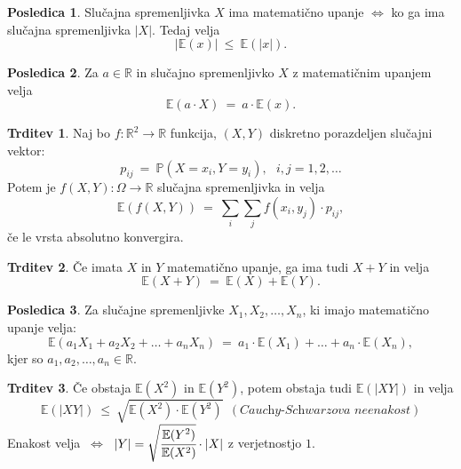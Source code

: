 \documentclass[11pt]{article}
\theoremstyle{definition}
\theoremstyle{definition}
\newtheorem{trditev}{Trditev}[section]
\theoremstyle{definition}
\newtheorem*{posledica}{Posledica}
\begin{document}
\begin{posledica}

Slučajna spremenljivka $X$ ima matematično upanje $\Leftrightarrow$ ko ga ima slučajna spremenljivka $|X|$. Tedaj velja
$$|\mathbb{E}(x)| ~\leq~ \mathbb{E}(|x|).$$

\end{posledica}
\vspace{0.5cm}

\begin{posledica}

Za $a \in \mathbb{R}$ in slučajno spremenljivko $X$ z matematičnim upanjem velja
$$\mathbb{E}(a \cdot X) ~=~ a \cdot \mathbb{E}(x).$$ 

\end{posledica}
\vspace{0.5cm}

\begin{trditev}

Naj bo $f: \mathbb{R}^2 \rightarrow \mathbb{R}$ funkcija, $(X, Y)$ diskretno porazdeljen slučajni vektor:
$$p_{ij} ~=~ \mathbb{P}(X = x_i, Y = y_i), ~~~i,j = 1, 2, \ldots$$
Potem je $f(X, Y): \Omega \rightarrow \mathbb{R}$ slučajna spremenljivka in velja
$$\mathbb{E}(f(X, Y)) ~=~ \sum_i \sum_j f(x_i, y_j) \cdot p_{ij},$$
če le vrsta absolutno konvergira.

\end{trditev}
\vspace{0.5cm}

\begin{trditev}

Če imata $X$ in $Y$ matematično upanje, ga ima tudi $X + Y$ in velja
$$\mathbb{E}(X + Y) ~=~ \mathbb{E}(X) + \mathbb{E}(Y).$$

\end{trditev}
\vspace{0.5cm}

\begin{posledica}

Za slučajne spremenljivke $X_1, X_2, \ldots, X_n$, ki imajo matematično upanje velja:
$$\mathbb{E}(a_1 X_1 + a_2 X_2 + \ldots + a_n X_n) ~=~ a_1 \cdot \mathbb{E}(X_1) + \ldots + a_n \cdot \mathbb{E}(X_n),$$
kjer so $a_1, a_2, \ldots, a_n \in \mathbb{R}$.

\end{posledica}
\vspace{0.5cm}

\begin{trditev}

Če obstaja $\mathbb{E}(X^2)$ in $\mathbb{E}(Y^2)$, potem obstaja tudi $\mathbb{E}(|XY|)$ in velja
$$\mathbb{E}(|XY|) ~\leq~ \sqrt{\mathbb{E}(X^2) \cdot \mathbb{E}(Y^2)} ~~(\textit{Cauchy-Schwarzova neenakost})$$
Enakost velja $~\Leftrightarrow~$ $|Y| = \sqrt{\cfrac{\mathbb{E}(Y^2)}{\mathbb{E}(X^2)}} \cdot |X|$ z verjetnostjo $1$.

\end{trditev}
\vspace{0.5cm}
\end{document}
